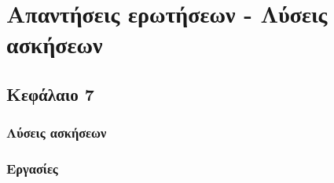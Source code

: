 \chapter{Απαντήσεις ερωτήσεων - Λύσεις ασκήσεων}
\begin{refsection}
\section{Κεφάλαιο 7}\label{sol_CH-7}
\subsection{Λύσεις ασκήσεων}
\subsection{Εργασίες}
\end{refsection}
